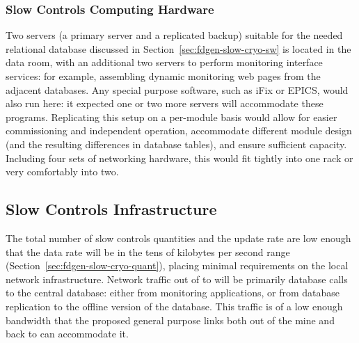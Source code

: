 \subsubsection{Slow Controls Computing Hardware}
\label{sec:fdgen-slow-cryo-slow-compute}

Two servers (a primary server and a replicated backup) suitable for the needed relational database discussed
in Section~\ref{sec:fdgen-slow-cryo-sw} is located in the  data
room, with an additional
two servers to perform  monitoring interface services: for
example, assembling dynamic  monitoring web pages from the adjacent
databases.  Any special purpose software, such as iFix or EPICS, would
also run here: it expected one or two more servers will accommodate
these programs.
Replicating this setup on a per-module basis would allow for easier
commissioning and independent operation, accommodate different module
design (and the resulting differences in database tables), and ensure
sufficient capacity.  Including four sets of networking hardware, this
would fit tightly into one rack or very comfortably into two.





\subsection{Slow Controls Infrastructure}
\label{sec:fdgen-slow-cryo-slow-infra}

The total number of slow controls quantities and the update rate are low enough
that the data rate will be in the tens of kilobytes per second range
(Section~\ref{sec:fdgen-slow-cryo-quant}), placing minimal requirements
on the local network infrastructure.
Network traffic out of \surf to \fnal will be primarily database calls
to the central  database: either from monitoring applications, or from
database replication to the offline version of the  database.  This
traffic is of a low enough bandwidth that the proposed general purpose
links both out of the mine and back to \fnal can accommodate it.

